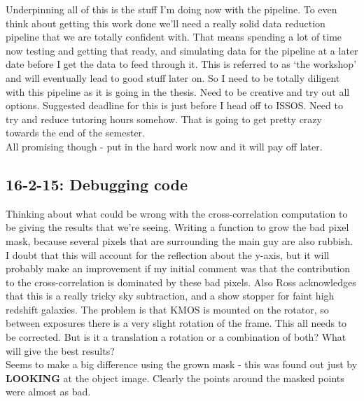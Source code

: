 \documentclass{literature}
\begin{document}
Underpinning all of this is the stuff I'm doing now with the pipeline. To even think about getting this work done we'll need a really solid data reduction pipeline that we are totally confident with. That means spending a lot of time now testing and getting that ready, and simulating data for the pipeline at a later date before I get the data to feed through it. This is referred to as `the workshop' and will eventually lead to good stuff later on. So I need to be totally diligent with this pipeline as it is going in the thesis. Need to be creative and try out all options. Suggested deadline for this is just before I head off to ISSOS. Need to try and reduce tutoring hours somehow. That is going to get pretty crazy towards the end of the semester.  \\ 

All promising though - put in the hard work now and it will pay off later.  

\subsection{16-2-15: Debugging code}
Thinking about what could be wrong with the cross-correlation computation to be giving the results that we're seeing. Writing a function to grow the bad pixel mask, because several pixels that are surrounding the main guy are also rubbish. I doubt that this will account for the reflection about the y-axis, but it will probably make an improvement if my initial comment was that the contribution to the cross-correlation is dominated by these bad pixels. Also Ross acknowledges that this is a really tricky sky subtraction, and a show stopper for faint high redshift galaxies. The problem is that KMOS is mounted on the rotator, so between exposures there is a very slight rotation of the frame. This all needs to be corrected. But is it a translation a rotation or a combination of both? What will give the best results?  \\ 
Seems to make a big difference using the grown mask - this was found out just by \textbf{LOOKING} at the object image. Clearly the points around the masked points were almost as bad. 
\end{document}
